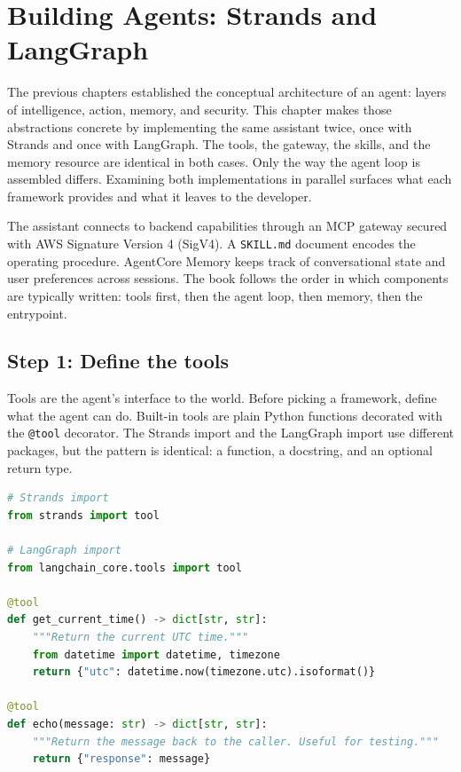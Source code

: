 \chapter{Building Agents: Strands and LangGraph}

The previous chapters established the conceptual architecture of an agent: layers of
intelligence, action, memory, and security. This chapter makes those abstractions concrete
by implementing the same assistant twice, once with Strands and once with LangGraph. The
tools, the gateway, the skills, and the memory resource are identical in both cases. Only
the way the agent loop is assembled differs. Examining both implementations in parallel
surfaces what each framework provides and what it leaves to the developer.

The assistant connects to backend capabilities through an MCP gateway secured with AWS
Signature Version 4 (SigV4). A \texttt{SKILL.md} document encodes the operating procedure.
AgentCore Memory keeps track of conversational state and user preferences across sessions.
The book follows the order in which components are typically written: tools first, then the
agent loop, then memory, then the entrypoint.

\section{Step 1: Define the tools}

Tools are the agent's interface to the world. Before picking a framework, define what the
agent can do. Built-in tools are plain Python functions decorated with the \texttt{@tool}
decorator. The Strands import and the LangGraph import use different packages, but the
pattern is identical: a function, a docstring, and an optional return type.

\begin{lstlisting}[language=Python]
# Strands import
from strands import tool

# LangGraph import
from langchain_core.tools import tool

@tool
def get_current_time() -> dict[str, str]:
    """Return the current UTC time."""
    from datetime import datetime, timezone
    return {"utc": datetime.now(timezone.utc).isoformat()}

@tool
def echo(message: str) -> dict[str, str]:
    """Return the message back to the caller. Useful for testing."""
    return {"response": message}
\end{lstlisting}

